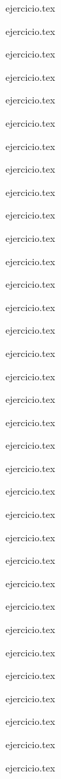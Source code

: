 \begin{enumerate}
    \setcounter{enumi}{1}
    \begin{minipage}{0.45\textwidth}
    {ejercicio.tex}
    \addtocounter{enumi}{1}
    {ejercicio.tex}
    \addtocounter{enumi}{1}
    {ejercicio.tex}
    \addtocounter{enumi}{1}
    {ejercicio.tex}
    \addtocounter{enumi}{1}
    {ejercicio.tex}
    \addtocounter{enumi}{1}
    {ejercicio.tex}
    \addtocounter{enumi}{1}
    {ejercicio.tex}
    \addtocounter{enumi}{1}
    {ejercicio.tex}
    \addtocounter{enumi}{1}
    {ejercicio.tex}
    \addtocounter{enumi}{1}
    {ejercicio.tex}
    \addtocounter{enumi}{1}
    {ejercicio.tex}
    \addtocounter{enumi}{1}
    {ejercicio.tex}
    \addtocounter{enumi}{1}
    {ejercicio.tex}
    \addtocounter{enumi}{1}
    {ejercicio.tex}
    \addtocounter{enumi}{1}
    {ejercicio.tex}
    \addtocounter{enumi}{1}
    {ejercicio.tex}
    \addtocounter{enumi}{1}
    {ejercicio.tex}
    \end{minipage}%
    \begin{minipage}{0.45\textwidth}
    \setcounter{enumi}{2}
    {ejercicio.tex}
    \addtocounter{enumi}{1}
    {ejercicio.tex}
    \addtocounter{enumi}{1}
    {ejercicio.tex}
    \addtocounter{enumi}{1}
    {ejercicio.tex}
    \addtocounter{enumi}{1}
    {ejercicio.tex}
    \addtocounter{enumi}{1}
    {ejercicio.tex}
    \addtocounter{enumi}{1}
    {ejercicio.tex}
    \addtocounter{enumi}{1}
    {ejercicio.tex}
    \addtocounter{enumi}{1}
    {ejercicio.tex}
    \addtocounter{enumi}{1}
    {ejercicio.tex}
    \addtocounter{enumi}{1}
    {ejercicio.tex}
    \addtocounter{enumi}{1}
    {ejercicio.tex}
    \addtocounter{enumi}{1}
    {ejercicio.tex}
    \addtocounter{enumi}{1}
    {ejercicio.tex}
    \addtocounter{enumi}{1}
    {ejercicio.tex}
    \addtocounter{enumi}{1}
    {ejercicio.tex}
    \addtocounter{enumi}{1}
    {ejercicio.tex}
    \end{minipage}
\end{enumerate}

